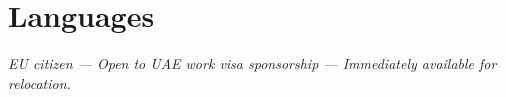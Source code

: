 \documentclass[11pt,a4paper,sans]{moderncv}
\begin{document}
\section{Languages}

\vfill
\begin{center}
    \footnotesize \textit{EU citizen --- Open to UAE work visa sponsorship --- Immediately available for relocation.}
\end{center}
\end{document}
